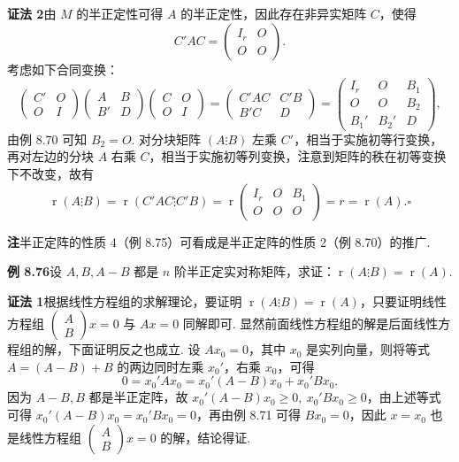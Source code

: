\documentclass[UTF8,12pt,a4paper,fontset=fandol]{ctexart}
\begin{document}
\noindent\textbf{证法 2}\quad 由 $M$ 的半正定性可得 $A$ 的半正定性，因此存在非异实矩阵 $C$，使得
\[
C'AC=\left(\begin{array}{cc}
I_r & O\\
O & O
\end{array}\right).
\]
考虑如下合同变换：
\[
\left(\begin{array}{cc}
C' & O\\
O & I
\end{array}\right)
\left(\begin{array}{cc}
A & B\\
B' & D
\end{array}\right)
\left(\begin{array}{cc}
C & O\\
O & I
\end{array}\right)
=
\left(\begin{array}{cc}
C'AC & C'B\\
B'C & D
\end{array}\right)
=
\left(\begin{array}{ccc}
I_r & O & B_1\\
O & O & B_2\\
B_1' & B_2' & D
\end{array}\right),
\]
由例 8.70 可知 $B_2=O$. 对分块矩阵 $(A\vdots B)$ 左乘 $C'$，相当于实施初等行变换，再对左边的分块 $A$ 右乘 $C$，相当于实施初等列变换，注意到矩阵的秩在初等变换下不改变，故有
\[
\operatorname{r}(A\vdots B)=\operatorname{r}(C'AC\vdots C'B)
=\operatorname{r}\left(\begin{array}{ccc}
I_r & O & B_1\\
O & O & O
\end{array}\right)=r=\operatorname{r}(A). \ensuremath{\square}
\]

\noindent\textbf{注}\quad 半正定阵的性质 4（例 8.75）可看成是半正定阵的性质 2（例 8.70）的推广.

\noindent\textbf{例 8.76}\quad 设 $A,B,A-B$ 都是 $n$ 阶半正定实对称矩阵，求证：$\operatorname{r}(A\vdots B)=\operatorname{r}(A)$.

\noindent\textbf{证法 1}\quad 根据线性方程组的求解理论，要证明 $\operatorname{r}(A\vdots B)=\operatorname{r}(A)$，只要证明线性方程组 $\left(\begin{array}{c}A\\ B\end{array}\right)x=0$ 与 $Ax=0$ 同解即可. 显然前面线性方程组的解是后面线性方程组的解，下面证明反之也成立. 设 $Ax_0=0$，其中 $x_0$ 是实列向量，则将等式 $A=(A-B)+B$ 的两边同时左乘 $x_0'$，右乘 $x_0$，可得
\[
0=x_0'Ax_0=x_0'(A-B)x_0+x_0'Bx_0.
\]
因为 $A-B,B$ 都是半正定阵，故 $x_0'(A-B)x_0\ge 0,\ x_0'Bx_0\ge 0$，由上述等式可得 $x_0'(A-B)x_0=x_0'Bx_0=0$，再由例 8.71 可得 $Bx_0=0$，因此 $x=x_0$ 也是线性方程组 $\left(\begin{array}{c}A\\ B\end{array}\right)x=0$ 的解，结论得证.
\end{document}
